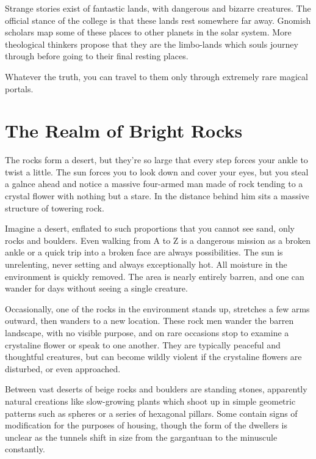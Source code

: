 Strange stories exist of fantastic lands, with dangerous and bizarre creatures.  The official stance of the \gls{college} is that these lands rest somewhere far away.
Gnomish scholars map some of these places to other planets in the solar system.
More theological thinkers propose that they are the limbo-lands which souls journey through before going to their final resting places.

Whatever the truth, you can travel to them only through extremely rare magical portals.

\section{The Realm of Bright Rocks}

\begin{multicols}{2}

\begin{boxtext}
	The rocks form a desert, but they're so large that every step forces your ankle to twist a little.  The sun forces you to look down and cover your eyes, but you steal a galnce ahead and notice a massive four-armed man made of rock tending to a crystal flower with nothing but a stare.  In the distance behind him sits a massive structure of towering rock.
\end{boxtext}

Imagine a desert, enflated to such proportions that you cannot see sand, only rocks and boulders.
Even walking from A to Z is a dangerous mission as a broken ankle or a quick trip into a broken face are always possibilities.  The sun is unrelenting, never setting and always exceptionally hot.  All moisture in the environment is quickly removed.  The area is nearly entirely barren, and one can wander for days without seeing a single creature.

Occasionally, one of the rocks in the environment stands up, stretches a few arms outward, then wanders to a new location.  These rock men wander the barren landscape, with no visible purpose, and on rare occasions stop to examine a crystaline flower or speak to one another.  They are typically peaceful and thoughtful creatures, but can become wildly violent if the crystaline flowers are disturbed, or even approached.

Between vast deserts of beige rocks and boulders are standing stones, apparently natural creations like slow-growing plants which shoot up in simple geometric patterns such as spheres or a series of hexagonal pillars.  Some contain signs of modification for the purposes of housing, though the form of the dwellers is unclear as the tunnels shift in size from the gargantuan to the minuscule constantly.


\end{multicols}
